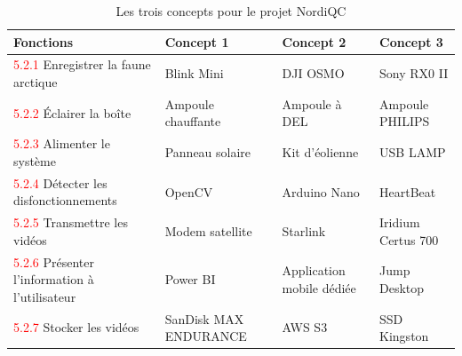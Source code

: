 
\setlength{\LTleft}{0pt}
\setlength{\LTright}{0pt}

\begin{table}[H]
  \centering
  \caption{Les trois concepts pour le projet NordiQC}
  \begin{tabularx}{\textwidth}{|X|C|C|C|}
    \hline
    \textbf{Fonctions} & \textbf{Concept 1} & \textbf{Concept 2} & \textbf{Concept 3} \\
    \hline

    \textcolor{red}{5.2.1} Enregistrer la faune arctique & Blink Mini & DJI OSMO & Sony RX0 II \\
    \hline
    \textcolor{red}{5.2.2} Éclairer la boîte & Ampoule chauffante & Ampoule à DEL & Ampoule PHILIPS \\
    \hline
    \textcolor{red}{5.2.3} Alimenter le système & Panneau solaire & Kit d'éolienne & USB LAMP \\
    \hline
    \textcolor{red}{5.2.4} Détecter les disfonctionnements & OpenCV & Arduino Nano & HeartBeat \\
    \hline
    \textcolor{red}{5.2.5} Transmettre les vidéos & Modem satellite & Starlink & Iridium Certus 700 \\
    \hline
    \textcolor{red}{5.2.6} Présenter l'information à l'utilisateur & Power BI & Application mobile dédiée & Jump Desktop \\
    \hline
    \textcolor{red}{5.2.7} Stocker les vidéos & SanDisk MAX ENDURANCE & AWS S3 & SSD Kingston \\
    \hline
  \end{tabularx}
\end{table}